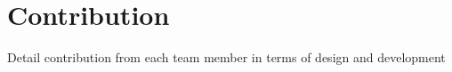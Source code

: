 \section{Contribution}


Detail contribution from each team member in terms of design
and development

